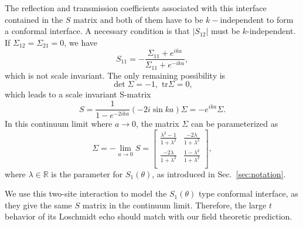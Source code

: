 The reflection and transmission coefficients associated with this interface contained in the $S$ matrix and both of them have to be $k-$independent to form a conformal interface\cite{peschel_exact_2012}. A necessary condition is that $|S_{12}|$ must be $k$-independent. If $\Sigma_{12} = \Sigma_{21} = 0 $, we have 
\begin{equation}
  S_{11} = - \frac{\Sigma_{11} + e^{ika} }{\Sigma_{11} + e^{-ika}},
\end{equation}
which is not scale invariant. The only remaining possibility is
\begin{equation}
\label{eq:Sigma_condition}
\det \Sigma = -1, \, \, \text{tr} \Sigma = 0,
\end{equation}
which leads to a scale invariant S-matrix 
\begin{equation}
S = \frac{1}{1 - e^{-2ika } } ( -2i \sin ka ) \Sigma
 = - e^{ika} \Sigma.
\end{equation}
In this continuum limit where $a\rightarrow0$, the matrix $\Sigma$ can be parameterized as
\begin{equation}
\Sigma = -\lim_{a \rightarrow 0 } S = 
\begin{bmatrix}
\frac{\lambda^2- 1}{1 + \lambda^2} & \frac{-2\lambda }{1 + \lambda^2} \\
\frac{-2\lambda }{1 + \lambda^2} & \frac{1- \lambda^2}{1 + \lambda^2} \\
\end{bmatrix},
\end{equation}
where $\lambda\in\mathbb{R}$ is the parameter for $S_1(\theta)$, as introduced in Sec.~\ref{sec:notation}. 

We use this two-site interaction to model the $S_1(\theta)$ type conformal interface, as they give the same $S$ matrix in the continuum limit. Therefore, the large $t$ behavior of its Loschmidt echo should match with our field theoretic prediction. 

